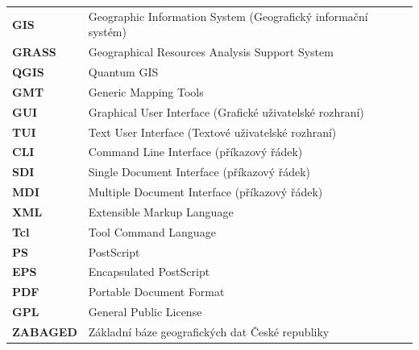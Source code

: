 \documentclass[a4paper,12pt,draft]{article}
\begin{document}
\begin{tabular}{ll}
\textbf{GIS}& Geographic Information System (Geografický informační systém)\\
\textbf{GRASS}& Geographical Resources Analysis Support System\\
\textbf{QGIS}& Quantum GIS\\
\textbf{GMT}& Generic Mapping Tools\\
\textbf{GUI}& Graphical User Interface (Grafické uživatelské rozhraní)\\
\textbf{TUI}& Text User Interface (Textové uživatelské rozhraní)\\
\textbf{CLI}& Command Line Interface (příkazový řádek)\\
\textbf{SDI}& Single Document Interface (příkazový řádek)\\
\textbf{MDI}& Multiple Document Interface (příkazový řádek)\\
\textbf{XML}& Extensible Markup Language\\
\textbf{Tcl}& Tool Command Language\\
\textbf{PS}& PostScript\\
\textbf{EPS}& Encapsulated PostScript\\
\textbf{PDF}& Portable Document Format\\
\textbf{GPL}& General Public License\\
\textbf{ZABAGED}& Základní báze geografických dat České republiky\\

\end{tabular}
\fi
\end{document}

